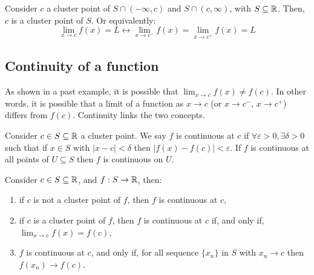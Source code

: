 \begin{theorem}
    Consider $c$ a cluster point of $S\cap(-\infty, c)$ and $S\cap(c, \infty)$, with $S \subseteq \mathbb{R}$. Then, $c$ is a cluster point of $S$. Or equivalently:
    \begin{equation*}
        \lim \limits_{x \to c} f(x) = L \longleftrightarrow \lim \limits_{x \to c^-} f(x)= \lim \limits_{x \to c^+} f(x) = L
    \end{equation*}
\end{theorem}

\subsection{Continuity of a function}

As shown in a past example, it is possible that $\lim_{x \to c} f(x) \neq f(c)$. In other words, it is possible that a limit of a function as $x \to c$ (or $x \to c^-$, $x \to c^+$) differs from $f(c)$. Continuity links the two concepts.

\begin{definition}
    Consider $c \in S \subseteq \mathbb{R}$ a cluster point. We say $f$ is continuous at $c$ if $\forall \varepsilon > 0, \exists \delta > 0$ such that if $x \in S$ with $|x-c| < \delta$ then $|f(x)-f(c)| < \varepsilon$. If $f$ is continuous at all points of $U \subseteq S$ then $f$ is continuous on $U$.
\end{definition}

\begin{theorem}
    Consider $c \in S \subseteq \mathbb{R}$, and $f: S \to \mathbb{R}$, then:
    \begin{enumerate}
        \item if $c$ is not a cluster point of $f$, then $f$ is continuous at $c$,
        \item if $c$ is a cluster point of $f$, then $f$ is continuous at $c$ if, and only if, $\lim_{x \to c} f(x) = f(c)$,
        \item $f$ is continuous at $c$, and only if, for all sequence $\{x_n\}$ in $S$ with $x_n \to c$ then $f(x_n) \to f(c)$.
    \end{enumerate}
\end{theorem}

